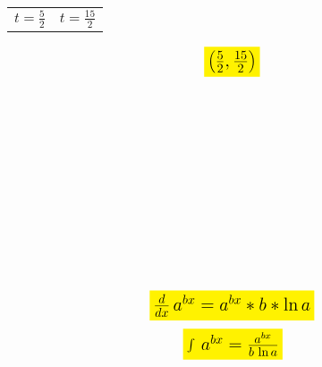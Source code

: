 \documentclass{report}
\begin{document}
{	\begin{center}
		\begin{tabular}{c c}
			$t = \frac{5}{2}$ & $t = \frac{15}{2}$ 
		\end{tabular}
	\end{center}

	\begin{align*}
		\Large{\colorbox{yellow}{\text{$\left(\frac{5}{2},\frac{15}{2}\right)$}}}
	\end{align*}\\\\\\\\\\\\\\\\\\\\\\
} 

\begin{align*}
	\Large{\colorbox{yellow}{\text{$\frac{d}{dx}\,a^{bx} = a^{bx} * b * \ln a$}}}
\end{align*}
\begin{align*}
	\Large{\colorbox{yellow}{\text{$\int\,a^{bx} = \frac{a^{bx}}{b\,\ln a}$}}}
\end{align*}
	
\end{document}
